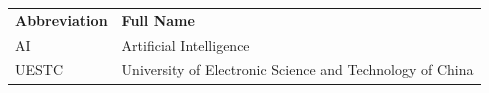 \uestcacronyms

\begingroup
\renewcommand{\arraystretch}{1.3}
\setlength{\tabcolsep}{9pt}
\noindent
\begin{tabularx}{\linewidth}{%
    >{\normalsize}l
    >{\normalsize\raggedright\arraybackslash}X}
    \textbf{Abbreviation} & \textbf{Full Name} \\
    AI & Artificial Intelligence \\
    UESTC & University of Electronic Science and Technology of China \\
\end{tabularx}
\par
\endgroup
